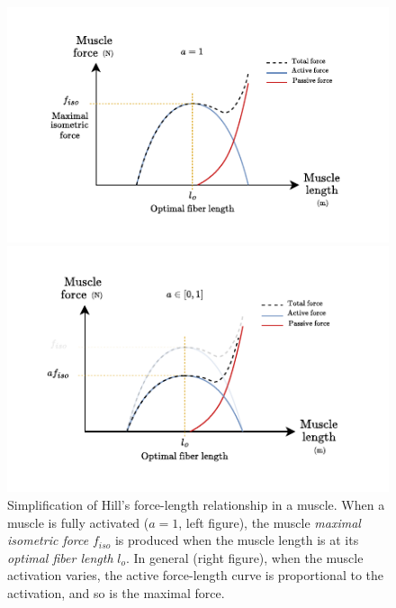 \begin{figure}[!htb]
    \captionsetup{justification=centering}
    \begin{minipage}{0.49\linewidth}
        \centering
        \includegraphics[trim={20 10 25 10}, clip, width=1\linewidth]{img/chapter_1/hill_force_length_relationship_fully_act.pdf}
    \end{minipage}
    \hfill
    \begin{minipage}{0.49\linewidth}
        \centering
        \includegraphics[trim={20 10 20 10}, clip, width=1\linewidth]{img/chapter_1/hill_force_length_relationship_all_act.pdf}
    \end{minipage}
    \caption{Simplification of Hill's force-length relationship in a muscle. When a muscle is fully activated ($a=1$, left figure), the muscle \emph{maximal isometric force} $f_{iso}$ is produced when the muscle length is at its \emph{optimal fiber length} $l_o$. In general (right figure), when the muscle activation varies, the active force-length curve is proportional to the activation, and so is the maximal force.}
    \label{fig:force_length_activation}
\end{figure}

